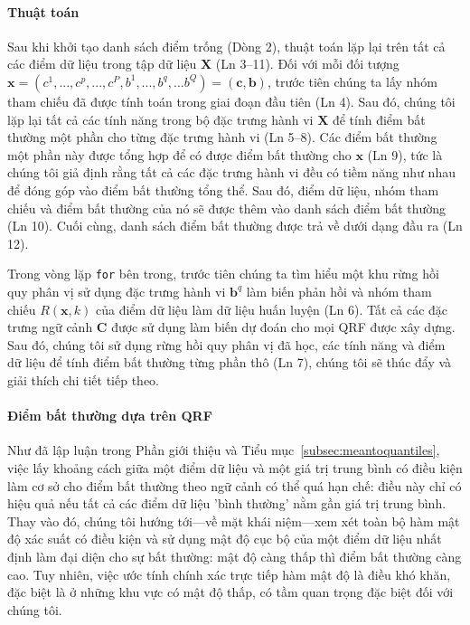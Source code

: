 \paragraph{Thuật toán}

Sau khi khởi tạo danh sách điểm trống (Dòng 2), thuật toán lặp lại trên tất cả các điểm dữ liệu trong tập dữ liệu $\mathbf{X}$ (Ln 3--11). Đối với mỗi đối tượng $\mathbf{x} =(c^{1},...,c^{p},...,c^{P},b^{1},...,b^{q},...b^{Q})=(\mathbf{c},\mathbf{b})$, trước tiên chúng ta lấy nhóm tham chiếu đã được tính toán trong giai đoạn đầu tiên (Ln 4). Sau đó, chúng tôi lặp lại tất cả các tính năng trong bộ đặc trưng hành vi $\mathbf{X}$ để tính điểm bất thường một phần cho từng đặc trưng hành vi (Ln 5--8). Các điểm bất thường một phần này được tổng hợp để có được điểm bất thường cho $\mathbf{x}$ (Ln 9), tức là chúng tôi giả định rằng tất cả các đặc trưng hành vi đều có tiềm năng như nhau để đóng góp vào điểm bất thường tổng thể. Sau đó, điểm dữ liệu, nhóm tham chiếu và điểm bất thường của nó sẽ được thêm vào danh sách điểm bất thường (Ln 10). Cuối cùng, danh sách điểm bất thường được trả về dưới dạng đầu ra (Ln 12).

Trong vòng lặp \texttt{for} bên trong, trước tiên chúng ta tìm hiểu một khu rừng hồi quy phân vị sử dụng đặc trưng hành vi $\mathbf{b}^{q}$ làm biến phản hồi và nhóm tham chiếu $R(\mathbf{x}, k)$ của điểm dữ liệu làm dữ liệu huấn luyện (Ln 6). Tất cả các đặc trưng ngữ cảnh $\mathbf{C}$ được sử dụng làm biến dự đoán cho mọi QRF được xây dựng. Sau đó, chúng tôi sử dụng rừng hồi quy phân vị đã học, các tính năng và điểm dữ liệu để tính điểm bất thường từng phần thô (Ln 7), chúng tôi sẽ thúc đẩy và giải thích chi tiết tiếp theo.\paragraph{Điểm bất thường dựa trên QRF}

Như đã lập luận trong Phần giới thiệu và Tiểu mục~\ref{subsec:meantoquantiles}, việc lấy khoảng cách giữa một điểm dữ liệu và một giá trị trung bình có điều kiện làm cơ sở cho điểm bất thường theo ngữ cảnh có thể quá hạn chế: điều này chỉ có hiệu quả nếu tất cả các điểm dữ liệu 'bình thường' nằm gần giá trị trung bình. Thay vào đó, chúng tôi hướng tới---về mặt khái niệm---xem xét toàn bộ hàm mật độ xác suất có điều kiện và sử dụng mật độ cục bộ của một điểm dữ liệu nhất định làm đại diện cho sự bất thường: mật độ càng thấp thì điểm bất thường càng cao. Tuy nhiên, việc ước tính chính xác trực tiếp hàm mật độ là điều khó khăn, đặc biệt là ở những khu vực có mật độ thấp, có tầm quan trọng đặc biệt đối với chúng tôi.

